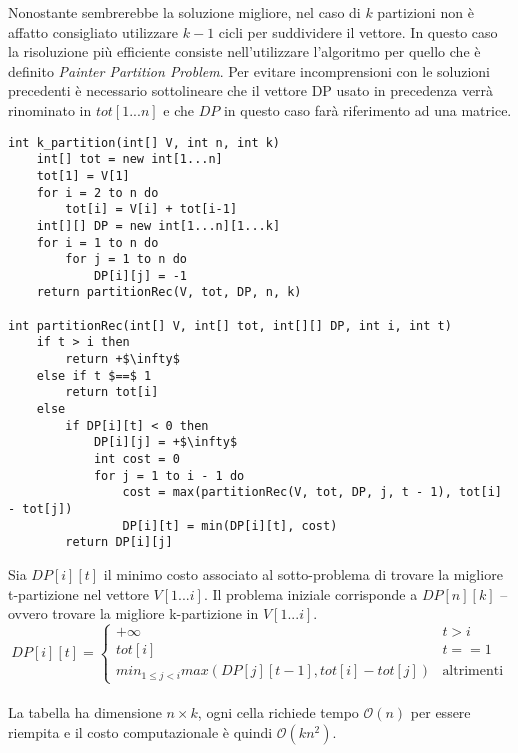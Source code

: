\documentclass[../cheatSheetAlgoritmi.tex]{subfiles}
\begin{document}
Nonostante sembrerebbe la soluzione migliore, nel caso di $k$ partizioni non è affatto consigliato utilizzare $k-1$ cicli per suddividere il vettore. In questo caso la risoluzione più efficiente consiste nell'utilizzare l'algoritmo per quello che è definito \emph{Painter Partition Problem}. Per evitare incomprensioni con le soluzioni precedenti è necessario sottolineare che il vettore DP usato in precedenza verrà rinominato in $tot[1...n]$ e che $DP$ in questo caso farà riferimento ad una matrice.

\begin{lstlisting}[caption=k-partizioni]
int k_partition(int[] V, int n, int k)
	int[] tot = new int[1...n]
	tot[1] = V[1]
	for i = 2 to n do
		tot[i] = V[i] + tot[i-1]
	int[][] DP = new int[1...n][1...k]
	for i = 1 to n do
		for j = 1 to n do
			DP[i][j] = -1
	return partitionRec(V, tot, DP, n, k)
	
int partitionRec(int[] V, int[] tot, int[][] DP, int i, int t)
	if t > i then
		return +$\infty$
	else if t $==$ 1
		return tot[i]
	else
		if DP[i][t] < 0 then
			DP[i][j] = +$\infty$
			int cost = 0
			for j = 1 to i - 1 do
				cost = max(partitionRec(V, tot, DP, j, t - 1), tot[i] - tot[j])
				DP[i][t] = min(DP[i][t], cost)
		return DP[i][j]
\end{lstlisting}
\newpage
\noindent
Sia $DP[i][t]$ il minimo costo associato al sotto-problema di trovare la migliore t-partizione nel vettore $V[1...i]$. Il problema iniziale corrisponde a $DP[n][k]$ – ovvero trovare la migliore k-partizione in $V[1...i]$.
\begin{equation*}
    DP[i][t]=\begin{cases}
        +\infty & \text{$t > i$}\\
        tot[i] & \text{$t == 1$} \\
        min_{1 \leq j < i}max(DP[j][t-1], tot[i] - tot[j]) & \text{altrimenti}
    \end{cases}
\end{equation*}
\\La tabella ha dimensione $n \times k$, ogni cella richiede tempo $\mathcal{O}(n)$ per essere riempita e il costo computazionale è quindi $\mathcal{O}(kn^{2})$.
\end{document}
